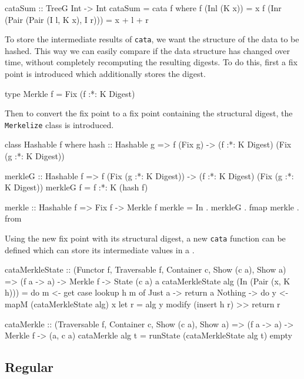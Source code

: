 \begin{haskell}
cataSum :: TreeG Int -> Int
cataSum = cata f
  where
    f (Inl (K x))                         = x
    f (Inr (Pair (Pair (I l, K x), I r))) = x + l + r
\end{haskell}

To store the intermediate results of \texttt{cata}, we want the structure of the data to be hashed. This way we can easily compare if the data structure has changed over time, without completely recomputing the resulting digests. To do this, first a fix point is introduced which additionally stores the digest.

\begin{haskell}
type Merkle f = Fix (f :*: K Digest)
\end{haskell}

Then to convert the fix point to a fix point containing the structural digest, the \texttt{Merkelize} class is introduced. 

\begin{haskell}
class Hashable f where
    hash :: Hashable g => f (Fix g) -> (f :*: K Digest) (Fix (g :*: K Digest))

merkleG :: Hashable f 
        => f (Fix (g :*: K Digest)) -> (f :*: K Digest) (Fix (g :*: K Digest))
merkleG f = f :*: K (hash f)

merkle :: Hashable f => Fix f -> Merkle f
merkle = In . merkleG . fmap merkle . from
\end{haskell}

Using the new fix point with its structural digest, a new \texttt{cata} function can be defined which can store its intermediate values in a . 

\begin{haskell}
cataMerkleState :: (Functor f, Traversable f, Container c, Show (c a), Show a)
                => (f a -> a) -> Merkle f -> State (c a) a
cataMerkleState alg (In (Pair (x, K h))) = do m <- get
  case lookup h m of
    Just a  -> return a
    Nothing -> do y <- mapM (cataMerkleState alg) x
               let r = alg y
               modify (insert h r) >> return r

cataMerkle :: (Traversable f, Container c, Show (c a), Show a)
           => (f a -> a) -> Merkle f -> (a, c a)
cataMerkle alg t = runState (cataMerkleState alg t) empty
\end{haskell}

\subsection{Regular}
